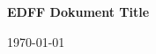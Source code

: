 \documentclass[10pt,a4paper]{article}
\begin{document}
\setlength{\parindent}{0pt}

\begin{center}
\huge
\textbf{EDFF Dokument Title}
\normalsize


\today
\end{center}

\tableofcontents





\end{document}
